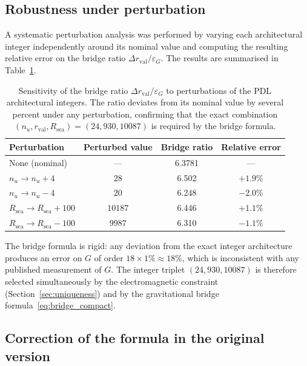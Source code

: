 \documentclass[11pt,a4paper]{article}
\begin{document}
\subsection{Robustness under perturbation}

A systematic perturbation analysis was performed by varying each architectural integer independently around its nominal value and computing the resulting relative error on the bridge ratio $\Delta r_{\mathrm{val}}/\varepsilon_G$. The results are summarised in Table~\ref{tab:robustness}.

\begin{table}[ht]
\centering
\caption{Sensitivity of the bridge ratio $\Delta r_{\mathrm{val}}/\varepsilon_G$ to perturbations of the PDL architectural integers. The ratio deviates from its nominal value by several percent under any perturbation, confirming that the exact combination $(n_u, r_{\mathrm{val}}, R_{\mathrm{sea}}) = (24, 930, 10087)$ is required by the bridge formula.}

\bigskip

\label{tab:robustness}
\begin{tabular}{lccc}
\toprule
Perturbation & Perturbed value 
    & Bridge ratio & Relative error \\
\midrule
None (nominal)   & ---    & 6.3781 & --- \\
$n_u \to n_u+4$  & $28$   & 6.502  & $+1.9\%$ \\
$n_u \to n_u-4$  & $20$   & 6.248  & $-2.0\%$ \\
$R_{\mathrm{sea}} \to R_{\mathrm{sea}}+100$ 
                 & $10187$& 6.446  & $+1.1\%$ \\
$R_{\mathrm{sea}} \to R_{\mathrm{sea}}-100$ 
                 & $9987$ & 6.310  & $-1.1\%$ \\
\bottomrule
\end{tabular}
\end{table}

The bridge formula is rigid: any deviation from the exact integer architecture produces an error on $G$ of order $18 \times 1\% \approx 18\%$, which is inconsistent with any published measurement of $G$. The integer triplet $(24, 930, 10087)$ is therefore selected simultaneously by the electromagnetic constraint (Section~\ref{sec:uniqueness}) and by the gravitational bridge formula~\eqref{eq:bridge_compact}.

\subsection{Correction of the formula in the original version}
\end{document}
